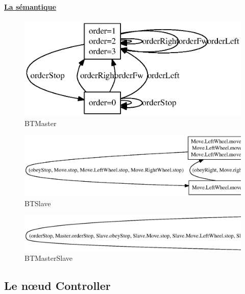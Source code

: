     \paragraph{\underline{La sémantique}}
    \begin{figure}[!ht]
     \begin{center}
      \includegraphics[width=16cm]{../src/altarica/BTMaster.eps}
      \caption{BTMaster}
     \end{center}
    \end{figure}
    \begin{figure}[!ht]
     \begin{center}
      \includegraphics[width=16cm]{../src/altarica/BTSlave.eps}
      \caption{BTSlave}
     \end{center}
    \end{figure}
    \begin{figure}[!ht]
     \begin{center}
      \includegraphics[width=16cm]{../src/altarica/BTMasterSlave.eps}
      \caption{BTMasterSlave}
     \end{center}
    \end{figure}
   
  \subsection{Le n\oe{}ud Controller}
   
